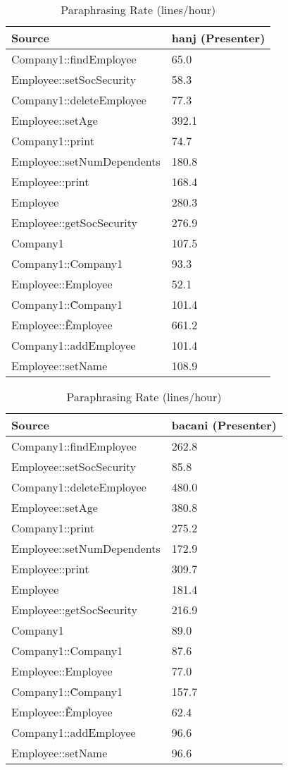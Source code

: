 \begin{table}[hb]
\begin{center}
\begin{tabular}{|l|l|}
\hline
Source & hanj (Presenter)\\
\hline
Company1::findEmployee & 65.0\\
Employee::setSocSecurity & 58.3\\
Company1::deleteEmployee & 77.3\\
Employee::setAge & 392.1\\
Company1::print & 74.7\\
Employee::setNumDependents & 180.8\\
Employee::print & 168.4\\
Employee & 280.3\\
Employee::getSocSecurity & 276.9\\
Company1 & 107.5\\
Company1::Company1 & 93.3\\
Employee::Employee & 52.1\\
Company1::\~Company1 & 101.4\\
Employee::\~Employee & 661.2\\
Company1::addEmployee & 101.4\\
Employee::setName & 108.9\\
\hline
\end{tabular}
\end{center}
\caption{Paraphrasing Rate (lines/hour)}
\end{table}

\begin{table}[hb]
\begin{center}
\begin{tabular}{|l|l|}
\hline
Source & bacani (Presenter)\\
\hline
Company1::findEmployee & 262.8\\
Employee::setSocSecurity & 85.8\\
Company1::deleteEmployee & 480.0\\
Employee::setAge & 380.8\\
Company1::print & 275.2\\
Employee::setNumDependents & 172.9\\
Employee::print & 309.7\\
Employee & 181.4\\
Employee::getSocSecurity & 216.9\\
Company1 & 89.0\\
Company1::Company1 & 87.6\\
Employee::Employee & 77.0\\
Company1::\~Company1 & 157.7\\
Employee::\~Employee & 62.4\\
Company1::addEmployee & 96.6\\
Employee::setName & 96.6\\
\hline
\end{tabular}
\end{center}
\caption{Paraphrasing Rate (lines/hour)}
\end{table}
